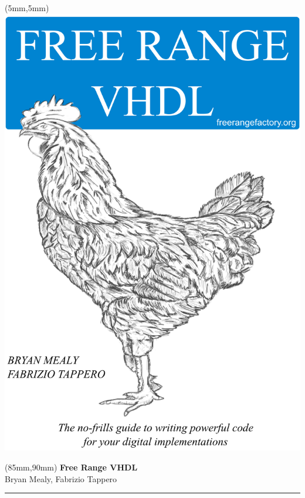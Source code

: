 \documentclass[11pt,b5paper]{book}
\begin{document}
	\thispagestyle{empty}
	\begin{textblock*}{160mm}(5mm,5mm)
	\includegraphics[width=160mm]{pics/cover1.png}  %
	\end{textblock*}
	\null\newpage %

	\thispagestyle{empty}
	\null\newpage

	\thispagestyle{empty}
	\begin{textblock*}{60mm}(85mm,90mm)
	\noindent
	{\sffamily\huge\bfseries Free Range VHDL}\\
	\noindent
	{\sffamily Bryan Mealy, Fabrizio Tappero}\\
	{\color{dark-gray}\rule[5pt]{190pt}{4pt}}
	\end{textblock*}
	\null\newpage
\end{document}
